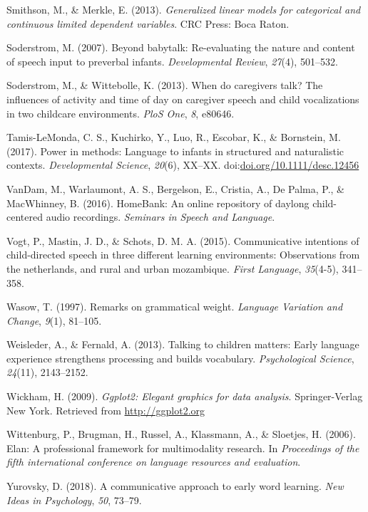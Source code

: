 \documentclass[floatsintext,man]{apa6}
\theoremstyle{definition}
\theoremstyle{definition}
\theoremstyle{definition}
\theoremstyle{remark}
\begin{document}
\hypertarget{ref-smithson2013generalized}{}
Smithson, M., \& Merkle, E. (2013). \emph{Generalized linear models for
categorical and continuous limited dependent variables}. CRC Press: Boca
Raton.

\hypertarget{ref-soderstrom2007beyond}{}
Soderstrom, M. (2007). Beyond babytalk: Re-evaluating the nature and
content of speech input to preverbal infants. \emph{Developmental
Review}, \emph{27}(4), 501--532.

\hypertarget{ref-soderstrom2013when}{}
Soderstrom, M., \& Wittebolle, K. (2013). When do caregivers talk? The
influences of activity and time of day on caregiver speech and child
vocalizations in two childcare environments. \emph{PloS One}, \emph{8},
e80646.

\hypertarget{ref-tamislemonda2017power}{}
Tamis-LeMonda, C. S., Kuchirko, Y., Luo, R., Escobar, K., \& Bornstein,
M. (2017). Power in methods: Language to infants in structured and
naturalistic contexts. \emph{Developmental Science}, \emph{20}(6),
XX--XX.
doi:\href{https://doi.org/doi.org/10.1111/desc.12456}{doi.org/10.1111/desc.12456}

\hypertarget{ref-HomeBank}{}
VanDam, M., Warlaumont, A. S., Bergelson, E., Cristia, A., De Palma, P.,
\& MacWhinney, B. (2016). HomeBank: An online repository of daylong
child-centered audio recordings. \emph{Seminars in Speech and Language}.

\hypertarget{ref-vogt2015communicative}{}
Vogt, P., Mastin, J. D., \& Schots, D. M. A. (2015). Communicative
intentions of child-directed speech in three different learning
environments: Observations from the netherlands, and rural and urban
mozambique. \emph{First Language}, \emph{35}(4-5), 341--358.

\hypertarget{ref-wasow1997remarks}{}
Wasow, T. (1997). Remarks on grammatical weight. \emph{Language
Variation and Change}, \emph{9}(1), 81--105.

\hypertarget{ref-weisleder2013talking}{}
Weisleder, A., \& Fernald, A. (2013). Talking to children matters: Early
language experience strengthens processing and builds vocabulary.
\emph{Psychological Science}, \emph{24}(11), 2143--2152.

\hypertarget{ref-R-ggplot2}{}
Wickham, H. (2009). \emph{Ggplot2: Elegant graphics for data analysis}.
Springer-Verlag New York. Retrieved from \url{http://ggplot2.org}

\hypertarget{ref-ELAN}{}
Wittenburg, P., Brugman, H., Russel, A., Klassmann, A., \& Sloetjes, H.
(2006). Elan: A professional framework for multimodality research. In
\emph{Proceedings of the fifth international conference on language
resources and evaluation}.

\hypertarget{ref-yurovsky2018communicative}{}
Yurovsky, D. (2018). A communicative approach to early word learning.
\emph{New Ideas in Psychology}, \emph{50}, 73--79.

\endgroup
\end{document}
